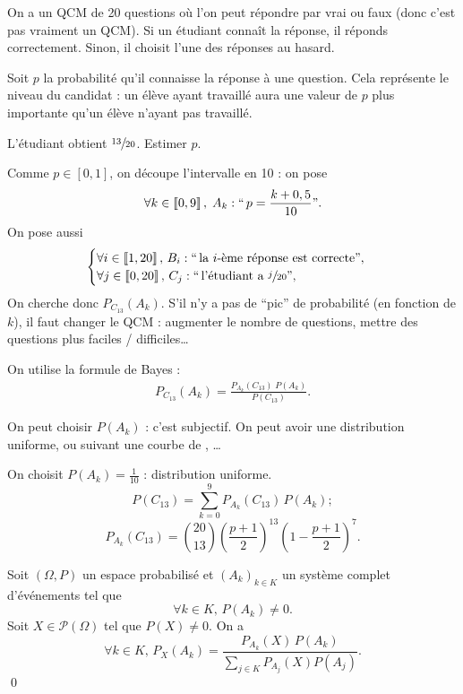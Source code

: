 \begin{exm}[QCM]
	On a un QCM de 20 questions où l'on peut répondre par vrai ou faux (donc c'est pas vraiment un QCM). Si un étudiant connaît la réponse, il réponds correctement. Sinon, il choisit l'une des réponses au hasard.

	Soit $p$ la probabilité qu'il connaisse la réponse à une question. Cela représente le niveau du candidat : un élève ayant travaillé aura une valeur de $p$ plus importante qu'un élève n'ayant pas travaillé.

	L'étudiant obtient $\sfrac{13}{20}$. Estimer $p$.

	Comme $p \in [0,1]$, on découpe l'intervalle en 10 : on pose \[
		\forall k \in \left\llbracket 0,9 \right\rrbracket,\; A_k : ``\,p = \frac{k+0,5}{10}".
	\] On pose aussi \[
	\begin{cases}
		\forall i \in \left\llbracket 1,20 \right\rrbracket,\, B_i : ``\,\text{la } i\text{-ème réponse est correcte}",\\
		\forall j \in \left\llbracket 0,20 \right\rrbracket,\, C_j : ``\,\text{l'étudiant a } \sfrac{j}{20}",\\
	\end{cases}
	\] On cherche donc $P_{C_{13}}(A_k)$. S'il n'y a pas de ``pic'' de probabilité (en fonction de $k$), il faut changer le QCM : augmenter le nombre de questions, mettre des questions plus faciles / difficiles\ldots

	On utilise la formule de Bayes :
	\begin{align*}
		P_{C_{13}}(A_k) = \frac{P_{A_k}(C_{13})\;P(A_k)}{P(C_{13})}.
	\end{align*}

	On peut choisir $P(A_k)$ : c'est subjectif. On peut avoir une distribution uniforme, ou suivant une courbe de \Gauss, \ldots

	On choisit $P(A_k) = \frac{1}{10}$ : distribution uniforme.
	\[
		P(C_{13}) = \sum_{k=0}^9 P_{A_k}(C_{13}) \,P(A_k);
	\] \[
		P_{A_k}(C_{13}) = {20 \choose 13} \left(\frac{p+1}{2}\right)^{13} \left( 1-\frac{p+1}{2} \right)^7.
	\]
\end{exm}

\begin{prop}[Bayes]
	Soit $(\Omega, P)$ un espace probabilisé et $(A_k)_{k \in K}$ un système complet d'événements tel que \[
		\forall k \in K,\, P(A_k) \neq 0.
	\] Soit $X \in \mathcal{P}(\Omega)$ tel que $P(X) \neq 0$. On a \[
		\forall k \in K,\, P_X(A_k) = \frac{P_{A_k}(X)\,P(A_k)}{\sum_{j \in K}P_{A_j}(X) P(A_j)}.
	\]\qed
\end{prop}

